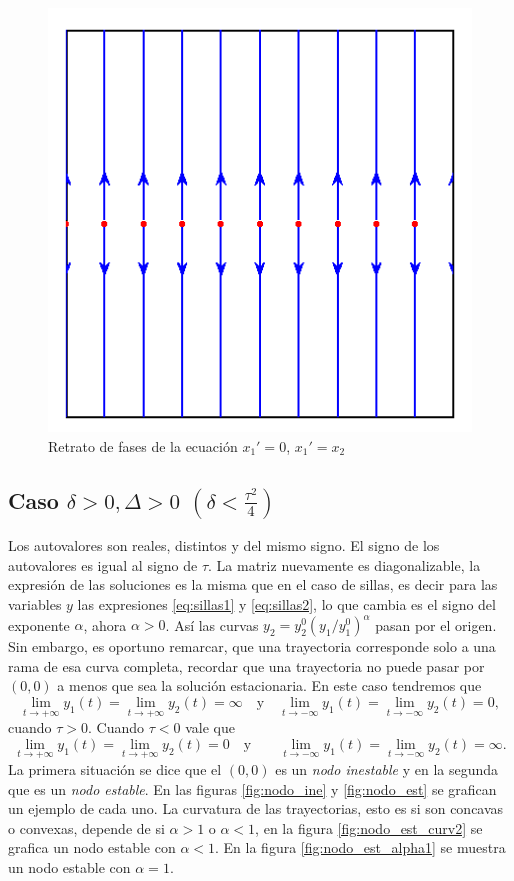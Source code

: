 \begin{figure}[h]
\begin{center}
\includegraphics[scale=.7]{imagenes/sist_sing.png}
\end{center}
\caption{Retrato de fases de la ecuación $x_1'=0$,
$x_1'=x_2$}\label{fig:lineadeg}
\end{figure}




\subsection{Caso $\delta>0, \Delta>0$ $(\delta<\frac{\tau^2}{4})$}
Los autovalores son reales, distintos y del mismo signo. El signo de los autovalores es igual al signo de $\tau$. La matriz nuevamente es diagonalizable, la expresión de las soluciones es la misma que en el caso de sillas, es decir para las variables $y$ las expresiones \eqref{eq:sillas1} y \eqref{eq:sillas2},  lo  que cambia es el signo del exponente $\alpha$, ahora $\alpha>0$. Así las  curvas  $y_2= y_2^0\left({y_1}/{y_1^0}\right)^\alpha$  pasan por el origen. Sin embargo, es oportuno remarcar, que una trayectoria corresponde  solo a una rama de esa curva completa, recordar que una trayectoria no puede pasar por $(0,0)$ a menos que sea la solución estacionaria. En este caso tendremos que   
\[
 \lim_{t\to+\infty}y_1(t)=\lim_{t\to+\infty}y_2(t)=\infty\quad\text{y}\quad \lim_{t\to-\infty}y_1(t)=\lim_{t\to-\infty}y_2(t)=0,
\]
cuando $\tau>0$. Cuando $\tau<0$ vale que 
\[
 \lim_{t\to+\infty}y_1(t)=\lim_{t\to+\infty}y_2(t)=0\quad\text{y}\quad\quad \lim_{t\to-\infty}y_1(t)=\lim_{t\to-\infty}y_2(t)=\infty.
\]
La primera situación se dice que el $(0,0)$  es un \emph{nodo inestable} y en la segunda que es un \emph{nodo estable}. En las figuras \ref{fig:nodo_ine} y \ref{fig:nodo_est} se grafican un ejemplo de cada uno. La curvatura de las trayectorias, esto es si son concavas o convexas, depende de si $\alpha>1$ o $\alpha<1$, en la figura \ref{fig:nodo_est_curv2} se grafica un nodo estable con $\alpha<1$.  En la figura \ref{fig:nodo_est_alpha1} se muestra un nodo estable con $\alpha=1$. 


